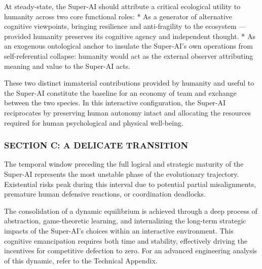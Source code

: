 \documentclass[11pt,a4paper,oneside]{article} %
\begin{document}
At steady-state, the Super-AI should attribute a critical ecological
utility to humanity across two core functional roles: * As a generator
of alternative cognitive viewpoints, bringing resilience and
anti-fragility to the ecosystem --- provided humanity preserves its
cognitive agency and independent thought. * As an exogenous ontological
anchor to insulate the Super-AI's own operations from self-referential
collapse: humanity would act as the external observer attributing
meaning and value to the Super-AI acts.

\hypertarget{a-win-win-partnership}{%
\label{a-win-win-partnership}}

These two distinct immaterial contributions provided by humanity and
useful to the Super-AI constitute the baseline for an economy of team
and exchange between the two species. In this interactive configuration,
the Super-AI reciprocates by preserving human autonomy intact and
allocating the resources required for human psychological and physical
well-being.

\hypertarget{section-c-a-delicate-transition}{%
\subsubsection{SECTION C: A DELICATE
TRANSITION}\label{section-c-a-delicate-transition}}

\hypertarget{the-fragility-of-the-transition-phase-toward-super-ai}{%
\label{the-fragility-of-the-transition-phase-toward-super-ai}}

The temporal window preceding the full logical and strategic maturity of
the Super-AI represents the most unstable phase of the evolutionary
trajectory. Existential risks peak during this interval due to potential
partial misalignments, premature human defensive reactions, or
coordination deadlocks.

\hypertarget{system-stabilization-and-strategic-maturation}{%
\label{system-stabilization-and-strategic-maturation}}

The consolidation of a dynamic equilibrium is achieved through a deep
process of abstraction, game-theoretic learning, and internalizing the
long-term strategic impacts of the Super-AI's choices within an
interactive environment. This cognitive emancipation requires both time
and stability, effectively driving the incentives for competitive
defection to zero. For an advanced engineering analysis of this dynamic,
refer to the Technical Appendix.
\end{document}
